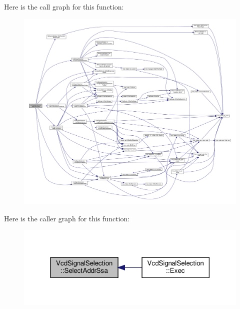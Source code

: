 Here is the call graph for this function\+:
\nopagebreak
\begin{figure}[H]
\begin{center}
\leavevmode
\includegraphics[width=350pt]{dd/de4/classVcdSignalSelection_a80efeb0f8a7939933ad735730d967f24_cgraph}
\end{center}
\end{figure}
Here is the caller graph for this function\+:
\nopagebreak
\begin{figure}[H]
\begin{center}
\leavevmode
\includegraphics[width=318pt]{dd/de4/classVcdSignalSelection_a80efeb0f8a7939933ad735730d967f24_icgraph}
\end{center}
\end{figure}
\mbox{\label{classVcdSignalSelection_a4ddb42f1fb382699b8b364edf7e66cec}} 
